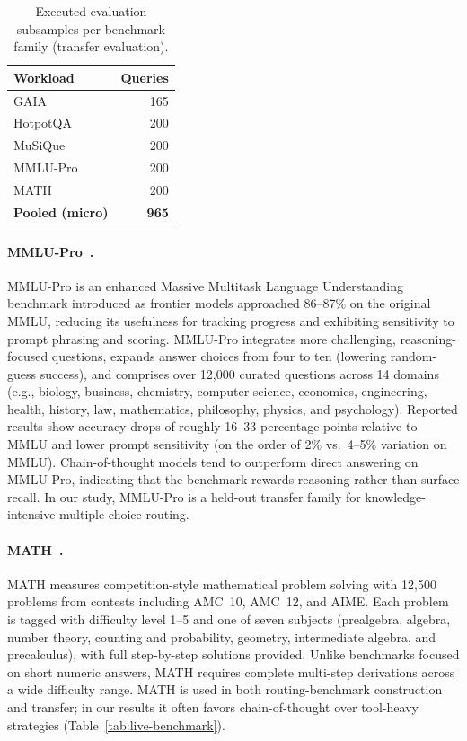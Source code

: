 \begin{table}[h]
  \centering
  \footnotesize
  \caption{Executed evaluation subsamples per benchmark family (transfer evaluation).}
  \label{tab:deployment-sizes}
  \begin{tabular}{@{}lr@{}}
    \toprule
    Workload & Queries \\
    \midrule
    GAIA & 165 \\
    HotpotQA & 200 \\
    MuSiQue & 200 \\
    MMLU-Pro & 200 \\
    MATH & 200 \\
    \textbf{Pooled (micro)} & \textbf{965} \\
    \bottomrule
  \end{tabular}
\end{table}

\paragraph{MMLU-Pro~\citep{wang2024mmlupro}.}
MMLU-Pro is an enhanced Massive Multitask Language Understanding benchmark introduced as frontier
models approached 86--87\% on the original MMLU, reducing its usefulness for tracking progress and
exhibiting sensitivity to prompt phrasing and scoring.
MMLU-Pro integrates more challenging, reasoning-focused questions, expands answer choices from
four to ten (lowering random-guess success), and comprises over 12{,}000 curated questions across
14 domains (e.g., biology, business, chemistry, computer science, economics, engineering, health,
history, law, mathematics, philosophy, physics, and psychology).
Reported results show accuracy drops of roughly 16--33 percentage points relative to MMLU and
lower prompt sensitivity (on the order of 2\% vs.\ 4--5\% variation on MMLU).
Chain-of-thought models tend to outperform direct answering on MMLU-Pro, indicating that the
benchmark rewards reasoning rather than surface recall.
In our study, MMLU-Pro is a held-out transfer family for knowledge-intensive multiple-choice
routing.

\paragraph{MATH~\citep{hendrycks2021math}.}
MATH measures competition-style mathematical problem solving with 12{,}500 problems from contests
including AMC~10, AMC~12, and AIME.
Each problem is tagged with difficulty level 1--5 and one of seven subjects (prealgebra, algebra,
number theory, counting and probability, geometry, intermediate algebra, and precalculus), with
full step-by-step solutions provided.
Unlike benchmarks focused on short numeric answers, MATH requires complete multi-step derivations
across a wide difficulty range.
MATH is used in both routing-benchmark construction and transfer; in our results it often favors
chain-of-thought over tool-heavy strategies (Table~\ref{tab:live-benchmark}).

